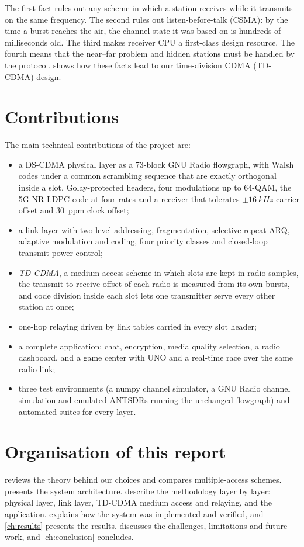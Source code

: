\documentclass[11pt,a4paper,oneside]{report}
\begin{document}
The first fact rules out any scheme in which a station receives while it transmits on the same
frequency. The second rules out listen-before-talk (CSMA): by the time a burst reaches the air, the
channel state it was based on is hundreds of milliseconds old. The third makes receiver CPU a
first-class design resource. The fourth means that the near--far problem and hidden stations must
be handled by the protocol.  shows how these facts lead to our
time-division CDMA (TD-CDMA) design.

\section{Contributions}
The main technical contributions of the project are:
\begin{itemize}
  \item a DS-CDMA physical layer as a 73-block GNU Radio flowgraph, with Walsh codes under a common
        scrambling sequence that are exactly orthogonal inside a slot, Golay-protected headers, four
        modulations up to 64-QAM, the 5G NR LDPC code at four rates and a receiver that tolerates
        $\pm\SI{16}{kHz}$ carrier offset and \SI{30}{ppm} clock offset;
  \item a link layer with two-level addressing, fragmentation, selective-repeat ARQ, adaptive
        modulation and coding, four priority classes and closed-loop transmit power control;
  \item \emph{TD-CDMA}, a medium-access scheme in which slots are kept in radio samples, the
        transmit-to-receive offset of each radio is measured from its own bursts, and code division
        inside each slot lets one transmitter serve every other station at once;
  \item one-hop relaying driven by link tables carried in every slot header;
  \item a complete application: chat, encryption, media quality selection, a radio dashboard, and
        a game center with UNO and a real-time race over the same radio link;
  \item three test environments (a numpy channel simulator, a GNU Radio channel simulation and
        emulated ANTSDRs running the unchanged flowgraph) and automated suites for every layer.
\end{itemize}

\section{Organisation of this report}
 reviews the theory behind our choices and compares multiple-access schemes.
 presents the system architecture.  describe the
methodology layer by layer: physical layer, link layer, TD-CDMA medium access and relaying, and
the application.  explains how the system was implemented and verified, and
\cref{ch:results} presents the results.  discusses the challenges, limitations
and future work, and \cref{ch:conclusion} concludes.
\end{document}
